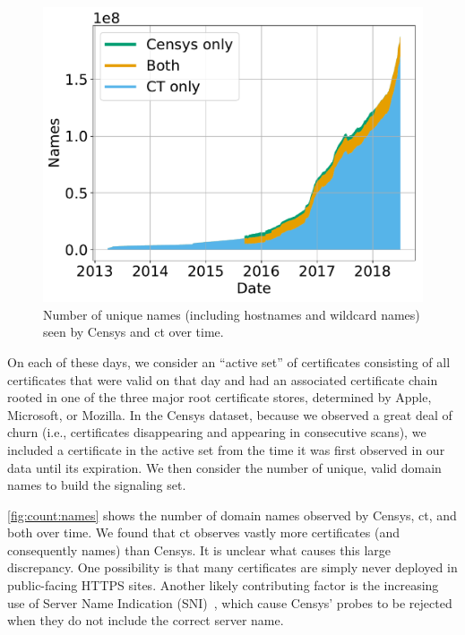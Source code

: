 \begin{figure}
  \centering
  \includegraphics[width=0.8\linewidth]{fig/name_count_valid}
  \vspace{-2mm}
  \caption{Number of unique names (including hostnames and wildcard names) seen
  by Censys and \ac{ct} over time.}
  \vspace{-5mm}
  \label{fig:count:names}
\end{figure}

On each of these days, we consider an ``active set'' of certificates consisting
of all certificates that were valid on that day and had an associated
certificate chain rooted in one of the three major root certificate stores,
determined by Apple, Microsoft, or Mozilla. In the Censys dataset, because we
observed a great deal of churn (i.e., certificates disappearing and appearing in
consecutive scans), we included a certificate in the active set from the time it
was first observed in our data until its expiration. We then consider the number
of unique, valid domain names to build the signaling set.

\autoref{fig:count:names} shows the number of domain names observed by Censys,
\ac{ct}, and both over time. We found that \ac{ct} observes vastly more
certificates (and consequently names) than Censys. It is unclear what causes
this large discrepancy. One possibility is that many certificates are simply
never deployed in public-facing HTTPS sites. Another likely contributing factor
is the increasing use of Server Name Indication (SNI)~\cite{rfc6066}, which
cause Censys' probes to be rejected when they do not include the correct server
name.

